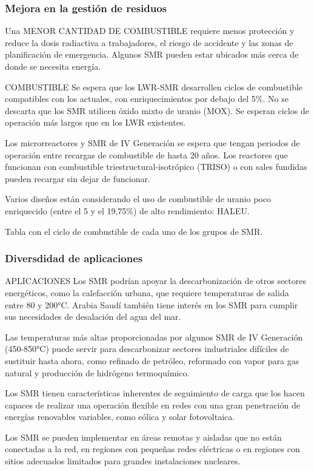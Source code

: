 \subsubsection{Mejora en la gestión de residuos}
Una MENOR CANTIDAD DE COMBUSTIBLE requiere menos protección y reduce la dosis radiactiva a trabajadores, el riesgo de accidente y las zonas de planificación de emergencia. Algunos SMR pueden estar ubicados más cerca de donde se necesita energía.

COMBUSTIBLE
Se espera que los LWR-SMR desarrollen ciclos de combustible compatibles con los actuales, con enriquecimientos por debajo del 5\%. No se descarta que los SMR utilicen óxido mixto de uranio (MOX). Se esperan ciclos de operación más largos que en los LWR existentes.

Los microrreactores y SMR de IV Generación se espera que tengan periodos de operación entre recargas de combustible de hasta 20 años. Los reactores que funcionan con combustible triestructural-isotrópico (TRISO) o con sales fundidas pueden recargar sin dejar de funcionar.

Varios diseños están considerando el uso de combustible de uranio poco enriquecido (entre el 5 y el 19,75\%) de alto rendimiento: HALEU.

Tabla con el ciclo de combustible de cada uno de los grupos de SMR.
\subsubsection{Diversdidad de aplicaciones}

APLICACIONES
Los SMR podrían apoyar la descarbonización de otros sectores energéticos, como la calefacción urbana, que requiere temperaturas de salida entre 80 y 200°C. Arabia Saudí también tiene interés en los SMR para cumplir sus necesidades de desalación del agua del mar.

Las temperaturas más altas proporcionadas por algunos SMR de IV Generación (450-850°C) puede servir para descarbonizar sectores industriales difíciles de sustituir hasta ahora, como refinado de petróleo, reformado con vapor para gas natural y producción de hidrógeno termoquímico.

Los SMR tienen características inherentes de seguimiento de carga que los hacen capaces de realizar una operación flexible en redes con una gran penetración de energías renovables variables, como eólica y solar fotovoltaica.

Los SMR se pueden implementar en áreas remotas y aisladas que no están conectadas a la red, en regiones con pequeñas redes eléctricas o en regiones con sitios adecuados limitados para grandes instalaciones nucleares.

